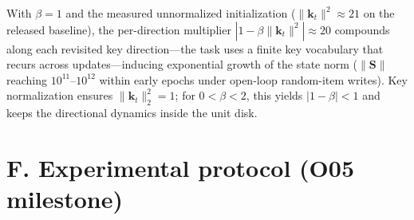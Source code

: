 \documentclass[11pt,a4paper]{article}
\newcommand{\St}{\mathbf{S}}
\begin{document}
With $\beta=1$ and the measured unnormalized initialization ($\|\mathbf{k}_t\|^2 \approx 21$ on the released baseline), the per-direction multiplier $|1-\beta\|\mathbf{k}_t\|^2| \approx 20$ compounds along each revisited key direction---the task uses a finite key vocabulary that recurs across updates---inducing exponential growth of the state norm ($\|\St\|$ reaching $10^{11}$--$10^{12}$ within early epochs under open-loop random-item writes). Key normalization ensures $\|\mathbf{k}_t\|_2^2 = 1$; for $0 < \beta < 2$, this yields $|1-\beta| < 1$ and keeps the directional dynamics inside the unit disk.

\section{F. Experimental protocol (O05 milestone)}\label{sec:F}
\end{document}
